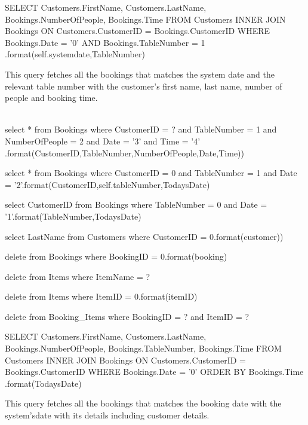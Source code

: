 \begin{sql}
SELECT
 Customers.FirstName,
 Customers.LastName,
 Bookings.NumberOfPeople,
 Bookings.Time
 FROM Customers
INNER JOIN Bookings
ON Customers.CustomerID = Bookings.CustomerID
WHERE Bookings.Date = '{0}'
AND Bookings.TableNumber = {1}
.format(self.systemdate,TableNumber)
\end{sql}
This query fetches all the bookings that matches the system date and the relevant table number with the customer's first name, last name, number of people and booking time. \\ \\

\begin{sql}
select * from Bookings where CustomerID = {?} and TableNumber = {1} and NumberOfPeople = {2} and Date = '{3}' and Time = '{4}' .format(CustomerID,TableNumber,NumberOfPeople,Date,Time))
\end{sql}

\begin{sql}
select * from Bookings where CustomerID = {0} and TableNumber = {1} and Date = '{2}'.format(CustomerID,self.tableNumber,TodaysDate)
\end{sql}

\begin{sql}
select CustomerID from Bookings where TableNumber = {0} and Date = '{1}'.format(TableNumber,TodaysDate)
\end{sql}

\begin{sql}
select LastName from Customers where CustomerID = {0}.format(customer))
\end{sql}

\begin{sql}
delete from Bookings where BookingID = {0}.format(booking)
\end{sql}

\begin{sql}
delete from Items where ItemName = ?
\end{sql}

\begin{sql}
delete from Items where ItemID = {0}.format(itemID)
\end{sql}

\begin{sql}
delete from Booking_Items where BookingID = ? and ItemID = ? 
\end{sql}

\begin{sql}
SELECT
 Customers.FirstName,
Customers.LastName,
 Bookings.NumberOfPeople,
 Bookings.TableNumber,
 Bookings.Time
FROM Customers
 INNER JOIN Bookings
 ON Customers.CustomerID = Bookings.CustomerID
 WHERE Bookings.Date = '{0}'
 ORDER BY Bookings.Time
.format(TodaysDate)
\end{sql}
This query fetches all the bookings that matches the booking date with the system'sdate with its details including customer details. \\ \\

